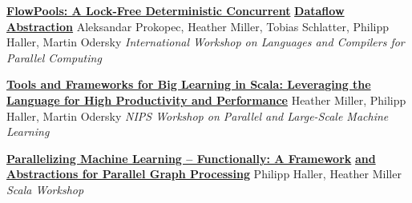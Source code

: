 \documentclass[9pt]{article}
\begin{document}
\noindent\href{http://infoscience.epfl.ch/record/180265}{\bf FlowPools: A Lock-Free Deterministic Concurrent}\vspace{-0.03in}
\newline\noindent\href{http://infoscience.epfl.ch/record/180265}{\bf Dataflow Abstraction}
\newline\noindent Aleksandar Prokopec, Heather Miller, Tobias Schlatter,
\newline\noindent Philipp Haller, Martin Odersky
\newline\noindent\emph{International Workshop on Languages and Compilers for Parallel Computing}
\vspace{0.03in}
\newline{}
\vspace{-0.03in}
\newline{}
\vspace{-0.03in}
\newline{}
\bigskip

\noindent\href{http://infoscience.epfl.ch/record/170032}{\bf Tools and Frameworks for Big Learning in Scala: Leveraging the}\vspace{-0.03in}
\newline\noindent\href{http://infoscience.epfl.ch/record/170032}{\bf Language for High Productivity and Performance}
\newline\noindent Heather Miller, Philipp Haller, Martin Odersky
\newline\noindent\emph{NIPS Workshop on Parallel and Large-Scale Machine Learning}
\bigskip

\noindent\href{http://infoscience.epfl.ch/record/165111}{\bf Parallelizing Machine Learning -- Functionally: A Framework}\vspace{-0.03in}
\newline\noindent\href{http://infoscience.epfl.ch/record/165111}{\bf and Abstractions for Parallel Graph Processing}
\newline\noindent Philipp Haller, Heather Miller
\newline\noindent\emph{Scala Workshop}

\pagebreak
\medskip
\end{document}
